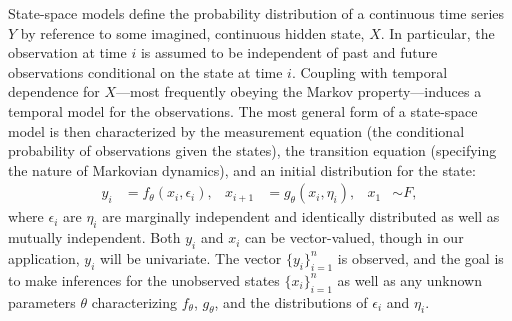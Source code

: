\documentclass[aoas]{imsart}
\begin{document}
State-space models define the probability distribution of a continuous
time series $Y$ by reference to some imagined, continuous hidden state, $X$. In
particular, the observation at time $i$ is assumed to be
independent of past and future observations conditional on the state
at time $i$. Coupling with temporal dependence for $X$---most
frequently obeying the Markov property---induces a temporal model for
the observations.  The most general form of a state-space model is
then characterized by the 
measurement equation (the conditional probability of observations
given the states),
the transition equation (specifying the nature of Markovian
dynamics), and an initial distribution for the state: 
\begin{equation}
\begin{aligned}
  y_i &= f_\theta(x_i,\epsilon_i), &
  x_{i+1} &= g_\theta(x_i,\eta_i), &
  x_1 &\sim F,
\end{aligned}
\label{eq:ssmod}
\end{equation}
where $\epsilon_i$ are $\eta_i$ are marginally independent and
identically distributed  as well as mutually independent. Both
$y_i$ and $x_i$ can be vector-valued, though in our
application, $y_i$ will be univariate. The
vector $\{y_i\}_{i=1}^n$ is observed, and the goal is to make
inferences for the unobserved states $\{x_i\}_{i=1}^n$ as well as any
unknown parameters $\theta$ characterizing $f_\theta$, $g_\theta$, and
the distributions of $\epsilon_i$ and $\eta_i$.

\end{document}
